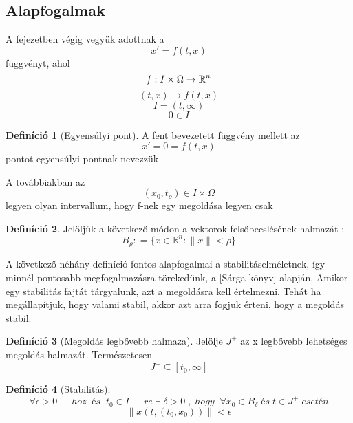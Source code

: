 \documentclass{article}
\theoremstyle{definition}
\theoremstyle{theorem}
\newtheorem{definition}{Definíció}
\begin{document}
\subsection{Alapfogalmak}
A fejezetben végig vegyük adottnak a
\begin{equation*}
    x' = f(t,x)
\end{equation*}
függvényt, ahol
\begin{equation*}
    f: I \times \Omega \rightarrow \mathbb{R}^n \\
\end{equation*}
\begin{equation*}
    (t,x) \rightarrow f(t,x)
\end{equation*}
\begin{equation*}
    I=(t,\infty)
\end{equation*}
\begin{equation*}
    0 \in I
\end{equation*}
\begin{definition}[Egyensúlyi pont]
A fent bevezetett függvény mellett az
\begin{equation*}
    x' = 0 = f(t,x)
\end{equation*}
pontot egyensúlyi pontnak nevezzük
\end{definition}
A továbbiakban az
\begin{equation*}
    (x_0,t_o) \in I \times \Omega
\end{equation*}
legyen olyan intervallum, hogy f-nek egy megoldása legyen csak

\begin{definition}
Jelöljük a következő módon a vektorok felsőbecslésének halmazát :
\begin{equation*}
    B_{\rho} : = \{ x \in \mathbb{R}^n: \lVert x \rVert < \rho \}
\end{equation*}
\end{definition}
A következő néhány definíció fontos alapfogalmai a stabilitáselméletnek, így minnél pontosabb megfogalmazásra törekedünk, a [Sárga könyv] alapján. Amikor egy stabilitás fajtát tárgyalunk, azt a megoldásra kell értelmezni. Tehát ha megállapítjuk, hogy valami stabil, akkor azt arra fogjuk érteni, hogy a megoldás stabil.
\begin{definition}[Megoldás legbővebb halmaza]
Jelölje $J^+$ az x legbővebb lehetséges megoldás halmazát. Természetesen
\begin{equation*}
    J^+ \subseteq [t_0, \infty]
\end{equation*}
\end{definition}
\begin{definition} [Stabilitás]
\begin{equation*}
    \forall \epsilon > 0 \;-hoz\;\;és\;\;t_0 \in I \;-re\; \exists\;
    \delta >0\;,\;hogy\;\; \forall x_0 \in B_{\delta} \;és\; t \in J^+ \;esetén
\end{equation*}
\begin{equation*}
    \lVert x(t,(t_0,x_0)) \rVert < \epsilon
\end{equation*}
\end{definition}
\end{document}
